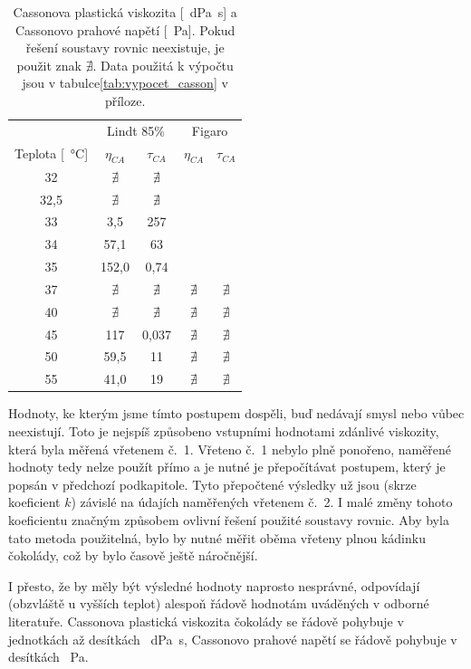 \documentclass[12pt]{article}
\begin{document}
\begin{table}[h!]
    \centering
    \begin{tabular}{|c|c c|c c|}
        \hline
        & \multicolumn{2}{c|}{Lindt 85\%} & \multicolumn{2}{c|}{Figaro}\\
        Teplota [\SI{}{\degreeCelsius}] & $\eta_{CA}$ & $\tau_{CA}$ & $\eta_{CA}$ & $\tau_{CA}$ \\\hline
        32 & $\nexists$ & $\nexists$ & &\\
        32,5 & $\nexists$ & $\nexists$ & &\\
        33 & 3,5 & 257 & & \\
        34 & 57,1 & 63 & & \\
        35 & 152,0 & 0,74 & & \\
        37 & $\nexists$ & $\nexists$ & $\nexists$ & $\nexists$\\
        40 & $\nexists$ & $\nexists$ & $\nexists$ & $\nexists$\\
        45 & 117 & 0,037 & $\nexists$ & $\nexists$\\
        50 & 59,5 & 11 & $\nexists$ & $\nexists$\\
        55 & 41,0 & 19 & $\nexists$ & $\nexists$\\\hline 
    \end{tabular}
    \caption{Cassonova plastická viskozita [\SI{}{\deci\pascal\second}] a Cassonovo prahové napětí [\SI{}{\pascal}]. Pokud řešení soustavy rovnic neexistuje, je použit znak $\nexists$. Data použitá k výpočtu jsou v tabulce\ref{tab:vypocet_casson} v příloze.}
    \label{tab:vysledky_casson}
\end{table}
\par\noindent
Hodnoty, ke kterým jsme tímto postupem dospěli, buď nedávají smysl nebo vůbec neexistují. Toto je nejspíš způsobeno vstupními hodnotami zdánlivé viskozity, která byla měřená vřetenem č.~1. Vřeteno č.~1 nebylo plně ponořeno, naměřené hodnoty tedy nelze použít přímo a je nutné je přepočítávat postupem, který je popsán v předchozí podkapitole. Tyto přepočtené výsledky už jsou (skrze koeficient $k$) závislé na údajích naměřených vřetenem č.~2. I malé změny tohoto koeficientu značným způsobem ovlivní řešení použité soustavy rovnic. Aby byla tato metoda použitelná, bylo by nutné měřit oběma vřeteny plnou kádinku čokolády, což by bylo časově ještě náročnější.
\par\noindent
I přesto, že by měly být výsledné hodnoty naprosto nesprávné, odpovídají (obzvláště u vyšších teplot) alespoň řádově hodnotám uváděných v odborné literatuře. Cassonova plastická viskozita čokolády se řádově pohybuje v jednotkách až desítkách \SI{}{\deci\pascal\second}, Cassonovo prahové napětí se řádově pohybuje v desítkách \SI{}{\pascal}.~\cite{Article:Rapid_and_economic_chocolate_viscosity}\cite{Article:viscosity_molten_milk_chocolate}\cite{Article:chocolate_shear_stress}
\end{document}
